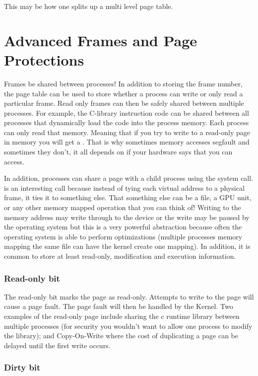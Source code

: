 This may be how one splits up a multi level page table.

\section{Advanced Frames and Page Protections}\label{advanced-frames-and-page-protections}

Frames be shared between processes! In addition to storing the frame number, the page table can be used to store whether a process can write or only read a particular frame. Read only frames can then be safely shared between multiple processes. For example, the C-library instruction code can be shared between all processes that dynamically load the code into the process memory. Each process can only read that memory. Meaning that if you try to write to a read-only page in memory you will get a . That is why sometimes memory accesses segfault and sometimes they don't, it all depends on if your hardware says that you can access.

In addition, processes can share a page with a child process using the  system call.  is an interesting call because instead of tying each virtual address to a physical frame, it ties it to something else. That something else can be a file, a GPU unit, or any other memory mapped operation that you can think of! Writing to the memory address may write through to the device or the write may be paused by the operating system but this is a very powerful abstraction because often the operating system is able to perform optimizations (multiple processes memory mapping the same file can have the kernel create one mapping). In addition, it is common to store at least read-only, modification and execution information.

\subsubsection{Read-only bit}
The read-only bit marks the page as read-only. Attempts to write to the page will cause a page fault. The page fault will then be handled by the Kernel. Two examples of the read-only page include sharing the c runtime library between multiple processes (for security you wouldn't want to allow one process to modify the library); and Copy-On-Write where the cost of duplicating a page can be delayed until the first write occurs.

\subsubsection{Dirty bit}

